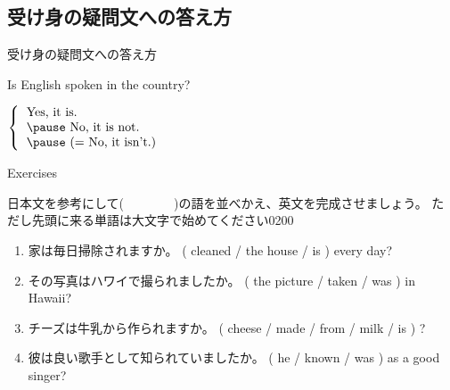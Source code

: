 \documentclass[aspectratio=169,xcolor={dvipsnames,table}]{beamer}
\newcommand{\myaudio}[1]{\href{#1}{\faVolumeUp}}
\begin{document}
\subsection{受け身の疑問文への答え方}
\begin{frame}[plain]{受け身の疑問文への答え方}
 \Large

Is English spoken in the country?

\vspace{20pt}
\pause

\mbox{}\hspace{100pt}$\left\{\begin{tabular}{ll}
         \text{Yes, it is.}&\\\pause
         \text{No, it is not.}&\\\pause
         \text{(}= \text{No, it isn't.)}&
        \end{tabular}\right.$



\end{frame}
\begin{frame}[plain]{Exercises}
 
{\small 日本文を参考にして(~~~~~~~~)の語を並べかえ、英文を完成させましょう。
ただし先頭に来る単語は大文字で始めてください}\hfill{\tiny 0200}\,{\scriptsize \myaudio{./audio/051_passive_08.mp3}}

\begin{enumerate}
 \item {\small 家は毎日掃除されますか}。
( cleaned / the house / is ) every day?\\
 \item {\small その写真はハワイで撮られましたか。}
( the picture / taken /  was ) in Hawaii?\\
 \item {\small チーズは牛乳から作られますか}。
( cheese / made / from / milk / is ) ?\\
 \item {\small 彼は良い歌手として知られていましたか。}
( he / known /  was ) as a good singer?\\
\end{enumerate}

\end{frame}
\end{document}

